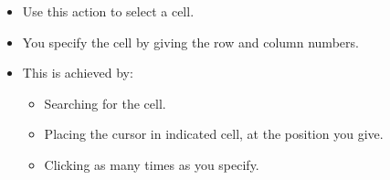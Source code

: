 \begin{itemize}
\item Use this action to select a cell.
\item You specify the cell by giving the row and column numbers.
\item This is achieved by:
\begin{itemize}
\item Searching for the cell.
\item Placing the cursor in indicated cell, at the position you give.
\item Clicking as many times as you specify.
\end{itemize}

\end{itemize}

